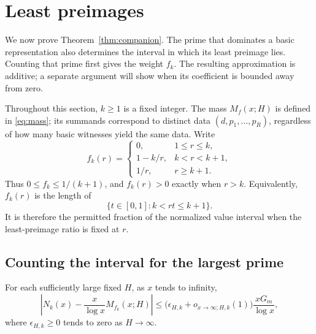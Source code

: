 \section{Least preimages}\label{sec:companion}

We now prove Theorem~\ref{thm:companion}.  The prime that dominates a
basic representation also determines the interval in which its least
preimage lies.  Counting that prime first gives the weight \(f_k\).
The resulting approximation is additive; a separate argument will show
when its coefficient is bounded away from zero.

Throughout this section, \(k\geq1\) is a fixed integer.  The mass
\(M_f(x;H)\) is defined in \eqref{eq:mass}; its summands correspond to
distinct data \((d,p_1,\ldots,p_R)\), regardless of how many basic
witnesses yield the same data.  Write
\[
 f_k(r)=
 \begin{cases}
  0,&1\leq r\leq k,\\
  1-k/r,&k<r<k+1,\\
  1/r,&r\geq k+1.
 \end{cases}
\]
Thus \(0\leq f_k\leq1/(k+1)\), and \(f_k(r)>0\) exactly when \(r>k\).
Equivalently, \(f_k(r)\) is the length of
\[
 \{t\in[0,1]:k<rt\leq k+1\}.
\]
It is therefore the permitted fraction of the normalized value interval
when the least-preimage ratio is fixed at \(r\).

\subsection{Counting the interval for the largest prime}

\begin{lemma}\label{lem:weighted-endpoint}
For each sufficiently large fixed \(H\), as \(x\) tends to infinity,
\begin{equation}\label{eq:weighted-mass}
 \left|N_k(x)-\frac{x}{\log x}M_{f_k}(x;H)\right|
 \leq\bigl(\epsilon_{H,k}+o_{x\to\infty;H,k}(1)\bigr)
       \frac{xG_m}{\log x},
\end{equation}
where \(\epsilon_{H,k}\geq0\) tends to zero as \(H\to\infty\).
\end{lemma}

